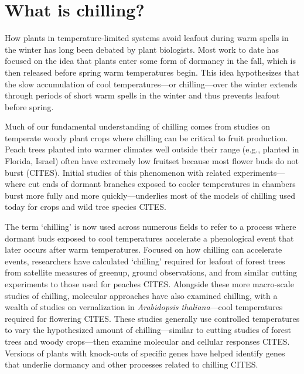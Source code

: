 \documentclass[11pt]{article}
\begin{document}
\section*{What is chilling?}

How plants in temperature-limited systems avoid leafout during warm spells in the winter has long been debated by plant biologists. Most work to date has focused on the idea that plants enter some form of dormancy in the fall, which is then released before spring warm temperatures begin. This idea hypothesizes that the slow accumulation of cool temperatures---or chilling---over the winter extends through periods of short warm spells in the winter and thus prevents leafout before spring. 

Much of our fundamental understanding of chilling comes from studies on temperate woody plant crops where chilling can be critical to fruit production. Peach trees planted into warmer climates well outside their range (e.g., planted in Florida, Israel) often have extremely low fruitset because most flower buds do not burst (CITES). Initial studies of this phenomenon with related experiments---where cut ends of dormant branches exposed to cooler temperatures in chambers burst more fully and more quickly---underlies most of the models of chilling used today for crops and wild tree species CITES. %

The term `chilling' is now used across numerous fields to refer to a process where dormant buds exposed to cool temperatures accelerate a phenological event that later occurs after warm temperatures. Focused on how chilling can accelerate events, researchers have calculated `chilling' required for leafout of forest trees from satellite measures of greenup, ground observations, and from similar cutting experiments to those used for peaches CITES.  %
Alongside these more macro-scale studies of chilling, molecular approaches have also examined chilling, with a wealth of studies on vernalization in \emph{Arabidopsis thaliana}---cool temperatures required for flowering CITES. These studies generally use controlled temperatures to vary the hypothesized amount of chilling---similar to cutting studies of forest trees and woody crops---then examine molecular and cellular responses CITES. Versions of plants with knock-outs of specific genes have helped identify genes that underlie dormancy and other processes related to chilling CITES. 
\end{document}
